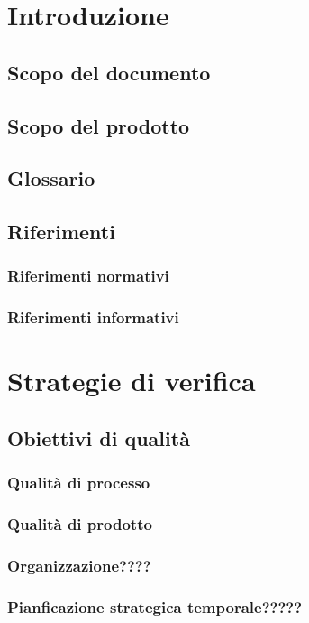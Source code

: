 \documentclass[a4paper, oneside, openany, dvipsnames, table]{article}
\begin{document}
\copertina{}

\newpage
\tableofcontents
\newpage


\section{Introduzione}
	\subsection{Scopo del documento}
	\subsection{Scopo del prodotto}
	\subsection{Glossario}
	\subsection{Riferimenti}
		\subsubsection{Riferimenti normativi}
		\subsubsection{Riferimenti informativi}
\section{Strategie di verifica}
	\subsection{Obiettivi di qualità}
		\subsubsection{Qualità di processo}
		\subsubsection{Qualità di prodotto}
		\subsubsection{Organizzazione????}
		\subsubsection{Pianficazione strategica temporale?????}
\end{document}
